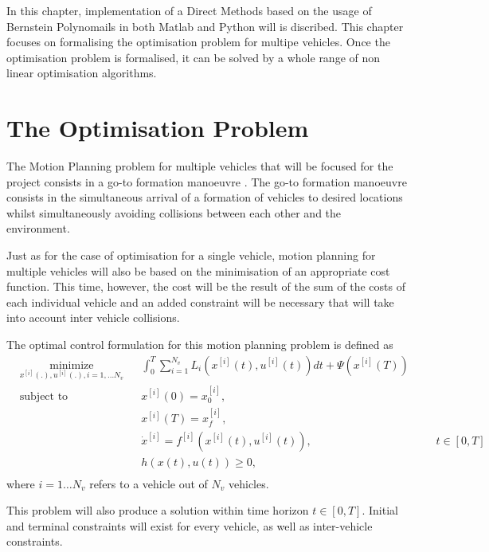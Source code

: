 \cleardoublepage
\label{chap:implementation}

\par In this chapter, implementation of a Direct Methods based on the usage of Bernstein Polynomails in both Matlab and Python will is discribed. This chapter focuses on formalising the optimisation problem for multipe vehicles. Once the optimisation problem is formalised, it can be solved by a whole range of non linear optimisation algorithms.

\section{The Optimisation Problem}
\label{sec:theoptproblem}

\par The Motion Planning problem for multiple vehicles that will be focused for the project consists in a go-to formation manoeuvre \cite{sabetghadam2018cooperative}. The go-to formation manoeuvre consists in the simultaneous arrival of a formation of vehicles to desired locations whilst simultaneously avoiding collisions between each other and the environment.

\par Just as for the case of optimisation for a single vehicle, motion planning for multiple vehicles will also be based on the minimisation of an appropriate cost function. This time, however, the cost will be the result of the sum of the costs of each individual vehicle and an added constraint will be necessary that will take into account inter vehicle collisions. 

\par The optimal control formulation for this motion planning problem is defined as
\begin{equation}
    \label{eq:multi_cost}
    \begin{aligned}
    & \underset{x^{[i]}(.),u^{[i]}(.),i= 1,\dots N_v}{\text{minimize}} && \int_0^T \sum_{i=1}^{N_v}  L_i (x^{[i]}(t),u^{[i]}(t))dt + \Psi (x^{[i]}(T)) \\
    & \text{subject to}  && x^{[i]}(0) = x_0^{[i]}, \\
        & && x^{[i]}(T) = x_f^{[i]}, \\
        & && \dot{x}^{[i]} = f^{[i]} (x^{[i]}(t), u^{[i]}(t)), &&& t \in [0,T]\\
        & && h(x(t),u(t)) \geq 0, \\
    \end{aligned}
\end{equation}
where $i=1\dots N_v$ refers to a vehicle out of $N_v$ vehicles.
\par This problem will also produce a solution within time horizon $t\in [0,T]$. Initial and terminal constraints will exist for every vehicle, as well as inter-vehicle constraints.


